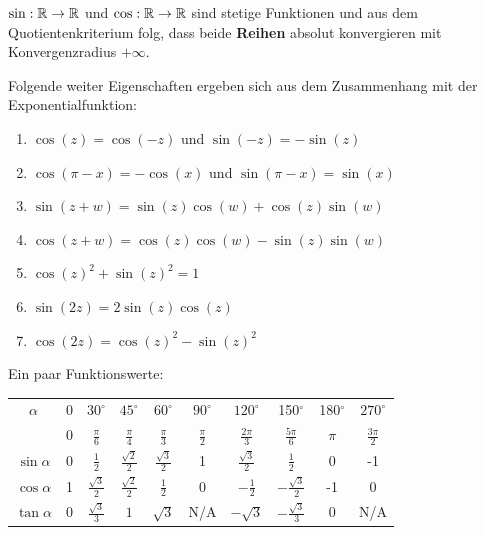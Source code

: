 \begin{tcolorbox}
	$\sin : \mathbb{R} \to \mathbb{R}$ und $\cos : \mathbb{R} \to \mathbb{R}$ sind stetige Funktionen und aus dem Quotientenkriterium
	folg, dass beide \textbf{Reihen} absolut konvergieren mit Konvergenzradius $+ \infty$.
\end{tcolorbox}

Folgende weiter Eigenschaften ergeben sich aus dem Zusammenhang mit der Exponentialfunktion:
\begin{enumerate}[label=(\arabic*)]
	\item $\cos(z) = \cos(-z)$ und $\sin(-z) = - \sin(z)$
	\item $\cos(\pi - x) = - \cos(x)$ und $\sin(\pi - x) = \sin(x)$
	\item $\sin(z + w) = \sin(z) \cos(w) + \cos(z) \sin(w)$
	\item $\cos(z + w) = \cos(z) \cos(w) - \sin(z) \sin(w)$
	\item $\cos(z)^2 + \sin(z)^2 = 1$
	\item $\sin(2z) = 2 \sin(z) \cos(z)$
	\item $\cos(2z) = \cos(z)^2 - \sin(z)^2$
\end{enumerate}

Ein paar Funktionswerte:
\vspace{-3mm}
\bgroup
\def\arraystretch{1.8}
\begin{center}
\begin{tabular}{c|c|c|c|c|c|c|c|c|c}
     \(\alpha\)& 0& \(30^{\circ}\)& \(45^{\circ}\)& \(60^{\circ}\)& \(90^{\circ}\)& \(120^{\circ}\)& 150\(^{\circ}\)& 180\(^{\circ}\)
     & \(270^{\circ}\)\\
     \(\)& 0& \(\frac{\pi}{6}\)& \(\frac{\pi}{4}\)& \(\frac{\pi}{3}\)& \(\frac{\pi}{2}\)&\(\frac{2\pi}{3}\)& \(\frac{5\pi}{6}\)& \(\pi\) & \(\frac{3\pi}{2}\)\\
     \hline
     \(\sin{\alpha}\)& 0& \(\frac{1}{2}\)& \(\frac{\sqrt{2}}{2}\)& \(\frac{\sqrt{3}}{2}\)& 1& \(\frac{\sqrt{3}}{2}\)& \(\frac{1}{2}\)& 0
     & -1\\
     \hline
     \(\cos{\alpha}\)& 1& \(\frac{\sqrt{3}}{2}\)& \(\frac{\sqrt{2}}{2}\)& \(\frac{1}{2}\)& 0& \(-\frac{1}{2}\)& \(-\frac{\sqrt{3}}{2}\)& -1
     & 0\\
     \hline
     \(\tan{\alpha}\)& 0& \(\frac{\sqrt{3}}{3}\)& \(1\)& \(\sqrt{3}\)& N/A & \(-\sqrt{3}\)& \(-\frac{\sqrt{3}}{3}\)& 0
     & N/A \\
\end{tabular}
\end{center}


